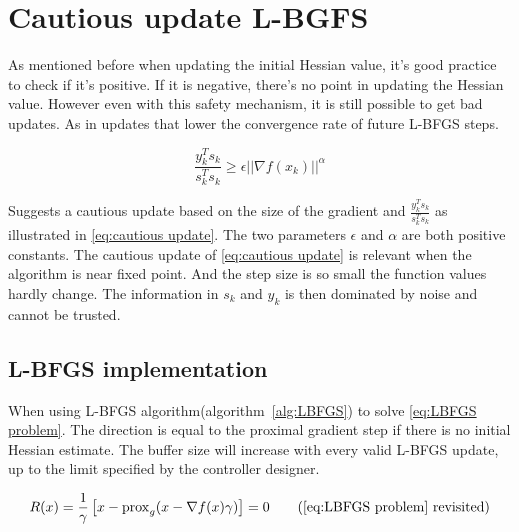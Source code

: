 	\section{Cautious update L-BGFS}
	As mentioned before when updating the initial Hessian value, it's good practice to check if it's positive. If it is negative, there's no point in updating the Hessian value. However even with this safety mechanism, it is still possible to get bad updates. As in updates that lower the convergence rate of future L-BFGS steps.
	
	\begin{equation}
		\frac{y_k^Ts_k}{s_k^Ts_k} \ge \epsilon ||\nabla f(x_k)||^\alpha
		\label{eq:cautious update}
	\end{equation}
	
	\cite{Dong-HuiLi1999} Suggests a cautious update based on the size of the gradient and $\frac{y_k^Ts_k}{s_k^Ts_k}$ as illustrated in \eqref{eq:cautious update}. The two parameters $\epsilon$ and $\alpha$ are both positive constants. The cautious update of \eqref{eq:cautious update} is relevant when the algorithm is near fixed point. And the step size is so small the function values hardly change. The information in $s_k$ and $y_k$ is then dominated by noise and cannot be trusted.
	
	\subsection{L-BFGS implementation}
		When using  L-BFGS algorithm(algorithm~\ref{alg:LBFGS}) to solve \eqref{eq:LBFGS problem}. The direction is equal to the proximal gradient step if there is no initial Hessian estimate. The buffer size will increase with every valid L-BFGS update, up to the limit specified by the controller designer.
		
		\begin{equation}
			R(x) = \frac{1}{\gamma}\left[ x - \prox_g( x - \nabla f(x)\gamma) \right] = 0
			\tag{\eqref{eq:LBFGS problem} revisited}
		\end{equation}
		
